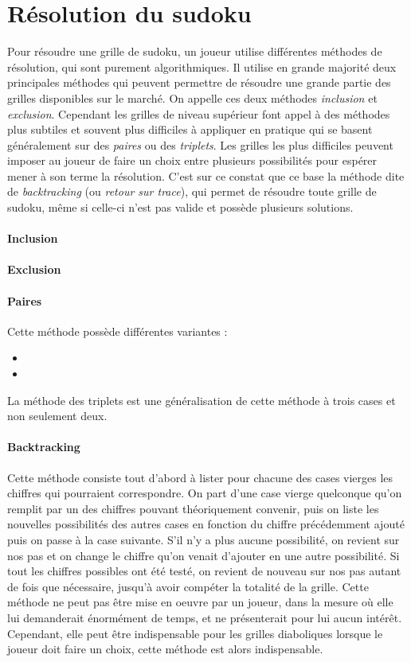 \documentclass[12pt,a4paper]{report}
\begin{document}
\section{Résolution du sudoku}
\label{Resolution}
Pour résoudre une grille de sudoku, un joueur utilise différentes méthodes de résolution, qui sont purement algorithmiques. Il utilise en grande majorité deux principales méthodes qui peuvent permettre de résoudre une grande partie des grilles disponibles sur le marché. On appelle ces deux méthodes \emph{inclusion} et \emph{exclusion}. Cependant les grilles de niveau supérieur font appel à des méthodes plus subtiles et souvent plus difficiles à appliquer en pratique qui se basent généralement sur des \emph{paires} ou des \emph{triplets}. Les grilles les plus difficiles peuvent imposer au joueur de faire un choix entre plusieurs possibilités pour espérer mener à son terme la résolution. C'est sur ce constat que ce base la méthode dite de \emph{backtracking} (ou \emph{retour sur trace}), qui permet de résoudre toute grille de sudoku, même si celle-ci n'est pas valide et possède plusieurs solutions.
\paragraph{Inclusion}
\paragraph{Exclusion}
\paragraph{Paires} Cette méthode possède différentes variantes :
\begin{itemize}[label=--]
\item 
\item
\end{itemize} 
La méthode des triplets est une généralisation de cette méthode à trois cases et non seulement deux.
\paragraph{Backtracking} Cette méthode consiste tout d'abord à lister pour chacune des cases vierges les chiffres qui pourraient correspondre. On part d'une case vierge quelconque qu'on remplit par un des chiffres pouvant théoriquement convenir, puis on liste les nouvelles possibilités des autres cases en fonction du chiffre précédemment ajouté puis on passe à la case suivante. S'il n'y a plus aucune possibilité, on revient sur nos pas et on change le chiffre qu'on venait d'ajouter en une autre possibilité. Si tout les chiffres possibles ont été testé, on revient de nouveau sur nos pas autant de fois que nécessaire, jusqu'à avoir compéter la totalité de la grille.
Cette méthode ne peut pas être mise en oeuvre par un joueur, dans la mesure où elle lui demanderait énormément de temps, et ne présenterait pour lui aucun intérêt. Cependant, elle peut être indispensable pour les grilles diaboliques lorsque le joueur doit faire un choix, cette méthode est alors indispensable.
\end{document}
